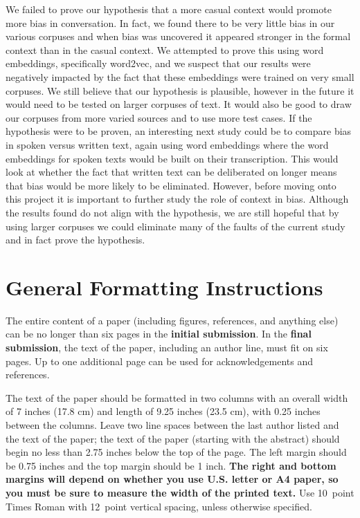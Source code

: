 \documentclass[10pt,letterpaper]{article}
\begin{document}
We failed to prove our hypothesis that a more casual context would promote more bias in conversation. In fact, we found there to be very little bias in our various corpuses and when bias was uncovered it appeared stronger in the formal context than in the casual context. We attempted to prove this using word embeddings, specifically word2vec, and we suspect that our results were negatively impacted by the fact that these embeddings were trained on very small corpuses. We still believe that our hypothesis is plausible, however in the future it would need to be tested on larger corpuses of text. It would also be good to draw our corpuses from more varied sources and to use more test cases. If the hypothesis were to be proven, an interesting next study could be to compare bias in spoken versus written text, again using word embeddings where the word embeddings for spoken texts would be built on their transcription. This would look at whether the fact that written text can be deliberated on longer means that bias would be more likely to be eliminated. However, before moving onto this project it is important to further study the role of context in bias. Although the results found do not align with the hypothesis, we are still hopeful that by using larger corpuses we could eliminate many of the faults of the current study and in fact prove the hypothesis.

\section{General Formatting Instructions}

The entire content of a paper (including figures, references, and anything else) can be no longer than six pages in the \textbf{initial submission}. In the \textbf{final submission}, the text of the paper, including an author line, must fit on six pages. Up to one additional page can be used for acknowledgements and references.

The text of the paper should be formatted in two columns with an
overall width of 7 inches (17.8 cm) and length of 9.25 inches (23.5
cm), with 0.25 inches between the columns. Leave two line spaces
between the last author listed and the text of the paper; the text of
the paper (starting with the abstract) should begin no less than 2.75 inches below the top of the
page. The left margin should be 0.75 inches and the top margin should
be 1 inch.  \textbf{The right and bottom margins will depend on
  whether you use U.S. letter or A4 paper, so you must be sure to
  measure the width of the printed text.} Use 10~point Times Roman
with 12~point vertical spacing, unless otherwise specified.
\end{document}
